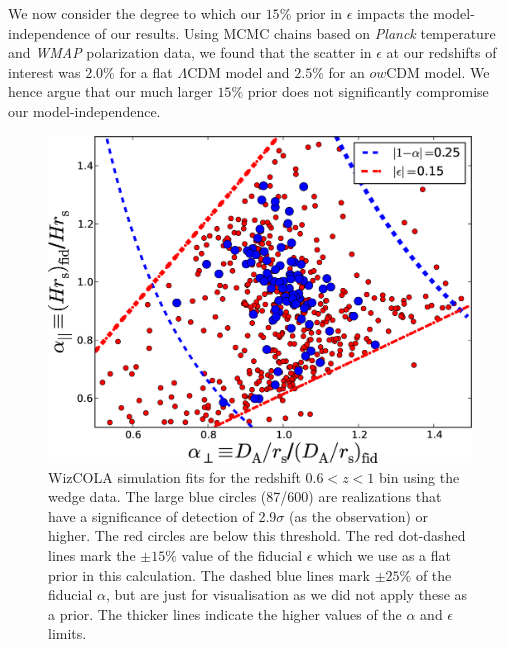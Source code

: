 \documentclass[a4paper,fleqn,usenatbib]{mnras}
\begin{document}
We now consider the degree to which our $15\%$ prior in $\epsilon$
impacts the model-independence of our results.  Using MCMC chains
based on {\sl Planck} temperature and {\sl WMAP} polarization data, we
found that the scatter in $\epsilon$ at our redshifts of interest was
$2.0\%$ for a flat $\Lambda$CDM model and $2.5\%$ for an $ow$CDM
model.  We hence argue that our much larger $15\%$ prior does not
significantly compromise our model-independence.

\begin{figure}
\begin{center}
\includegraphics[width=\columnwidth]{WiZCOLA_mode_z0pt6_1pt0.png}
\caption{\label{fig:wizcola_hdaModes_z60_epsilonT15} WizCOLA simulation fits for the redshift $0.6<z<1$ bin using the wedge data. The large blue circles (87/600) are realizations that have a significance of detection of 2.9$\sigma$ (as the observation) or higher. The red circles are below this threshold. The red dot-dashed lines mark the $\pm15\%$ value of the fiducial $\epsilon$ which we use as a flat prior in this calculation. The dashed blue lines mark $\pm25\%$ of the fiducial $\alpha$, but are just for visualisation as we did not apply these as a prior. The thicker lines indicate the higher values of the $\alpha$ and $\epsilon$ limits.%
}
\end{center}
\end{figure}
\end{document}
